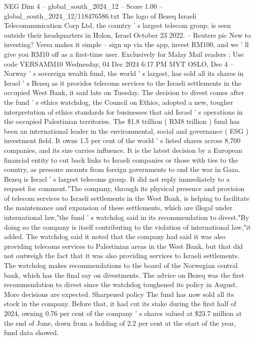 \begin{textsample}{NEG Dim 4 – global\_south\_2024\_12 – Score 1.00 – global\_south\_2024\_12/118476586.txt}  \label{ex:f4_neg_226}
The logo of Bezeq Israeli Telecommunication Corp Ltd, the country ' s largest telecom group, is seen outside their headquarters in Holon, Israel October 23 2022. -- Reuters pic New to investing?
Versa makes it simple -- sign up via the app, invest RM100, and we ' ll give you RM10 off as a first-time user.
Exclusively for Malay Mail readers : Use code VERSAMM10 Wednesday, 04 Dec 2024 6:17 PM MYT OSLO, Dec 4 -- Norway ' s sovereign wealth fund, the world ' s largest, has sold all its shares in Israel ' s Bezeq as it provides telecoms services to the Israeli settlements in the occupied West Bank, it said late on Tuesday.
The decision to divest comes after the fund ' s ethics watchdog, the Council on Ethics, adopted a new, tougher interpretation of ethics standards for businesses that aid Israel ' s operations in the occupied Palestinian territories.
The \$1.8 trillion ( RM8 trillion ) fund has been an international leader in the environmental, social and governance ( ESG ) investment field.
It owns 1.5 per cent of the world ' s listed shares across 8,700 companies, and its size carries influence.
It is the latest decision by a European financial entity to cut back links to Israeli companies or those with ties to the country, as pressure mounts from foreign governments to end the war in Gaza.
Bezeq is Israel ' s largest telecoms group.
It did not reply immediately to a request for comment."The company, through its physical presence and provision of telecom services to Israeli settlements in the West Bank, is helping to facilitate the maintenance and expansion of these settlements, which are illegal under international law,"the fund ' s watchdog said in its recommendation to divest."By doing so the company is itself contributing to the violation of international law,"it added.
The watchdog said it noted that the company had said it was also providing telecoms services to Palestinian areas in the West Bank, but that did not outweigh the fact that it was also providing services to Israeli settlements.
The watchdog makes recommendations to the board of the Norwegian central bank, which has the final say on divestments.
The advice on Bezeq was the first recommendation to divest since the watchdog toughened its policy in August.
More decisions are expected.
Sharpened policy The fund has now sold all its stock in the company.
Before that, it had cut its stake during the first half of 2024, owning 0.76 per cent of the company ' s shares valued at \$23.7 million at the end of June, down from a holding of 2.2 per cent at the start of the year, fund data showed.

\end{textsample}

